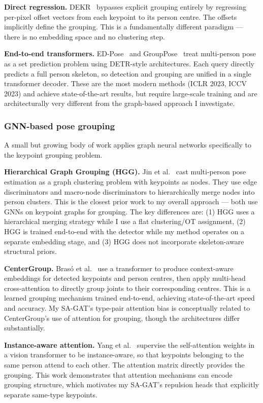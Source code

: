 \textbf{Direct regression.} DEKR~\cite{geng2021dekr} bypasses explicit grouping entirely by regressing per-pixel offset vectors from each keypoint to its person centre. The offsets implicitly define the grouping. This is a fundamentally different paradigm --- there is no embedding space and no clustering step.

\textbf{End-to-end transformers.} ED-Pose~\cite{yang2023edpose} and GroupPose~\cite{liu2023grouppose} treat multi-person pose as a set prediction problem using DETR-style architectures. Each query directly predicts a full person skeleton, so detection and grouping are unified in a single transformer decoder. These are the most modern methods (ICLR 2023, ICCV 2023) and achieve state-of-the-art results, but require large-scale training and are architecturally very different from the graph-based approach I investigate.

\subsubsection{GNN-based pose grouping}

A small but growing body of work applies graph neural networks specifically to the keypoint grouping problem.

\textbf{Hierarchical Graph Grouping (HGG).} Jin et al.~\cite{jin2020hgg} cast multi-person pose estimation as a graph clustering problem with keypoints as nodes. They use edge discriminators and macro-node discriminators to hierarchically merge nodes into person clusters. This is the closest prior work to my overall approach --- both use GNNs on keypoint graphs for grouping. The key differences are: (1) HGG uses a hierarchical merging strategy while I use a flat clustering/OT assignment, (2) HGG is trained end-to-end with the detector while my method operates on a separate embedding stage, and (3) HGG does not incorporate skeleton-aware structural priors.

\textbf{CenterGroup.} Bras\'o et al.~\cite{braso2021centergroup} use a transformer to produce context-aware embeddings for detected keypoints and person centres, then apply multi-head cross-attention to directly group joints to their corresponding centres. This is a learned grouping mechanism trained end-to-end, achieving state-of-the-art speed and accuracy. My SA-GAT's type-pair attention bias is conceptually related to CenterGroup's use of attention for grouping, though the architectures differ substantially.

\textbf{Instance-aware attention.} Yang et al.~\cite{yang2023instanceaware} supervise the self-attention weights in a vision transformer to be instance-aware, so that keypoints belonging to the same person attend to each other. The attention matrix directly provides the grouping. This work demonstrates that attention mechanisms can encode grouping structure, which motivates my SA-GAT's repulsion heads that explicitly separate same-type keypoints.

